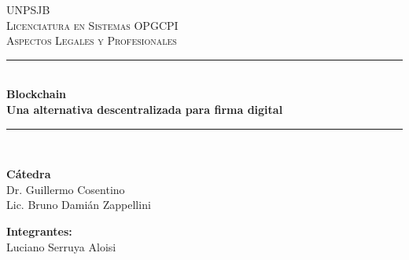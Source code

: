 \begin{titlepage}

    \newcommand{\HRule}{\rule{\linewidth}{0.5mm}} %

    \center %
     

    \textsc{\LARGE UNPSJB}\\[1cm] %
    \textsc{\Large Licenciatura en Sistemas OPGCPI}\\[0.5cm] %
    \textsc{\large Aspectos Legales y Profesionales}\\[0.5cm] %


    \HRule \\[0.4cm]
    {\huge \bfseries Blockchain}\\[0.4cm] %
    {\large \bfseries Una alternativa descentralizada para firma digital}\\[0.4cm] %
    \HRule \\[1.5cm]
     


    \begin{minipage}[l]{0.5\textwidth}
        \begin{flushleft}
            \textbf{\textsf{Cátedra}}\\
            \large Dr. Guillermo Cosentino\\
            \large Lic. Bruno Damián Zappellini\\ 
            \linespread{4}
            \end{flushleft}
    \end{minipage}
    \begin{minipage}[l]{0.4\textwidth}
        \begin{flushright}
            \textbf{\textsf{Integrantes:}}\\
            \linespread{1}
            \large Luciano Serruya Aloisi\\
        \end{flushright}
    \end{minipage}\\[1.5cm]


\end{titlepage}
